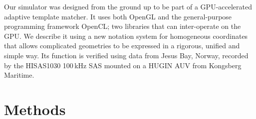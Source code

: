 
Our simulator was designed from the ground up to be part of a GPU-accelerated adaptive template matcher. It uses both OpenGL and the general-purpose programming framework OpenCL; two libraries that can inter-operate on the GPU. We describe it using a new notation system for homogeneous coordinates that allows complicated geometries to be expressed in a rigorous, unified and simple way. Its function is verified using data from Jesus Bay, Norway, recorded by the HISAS1030 100\,kHz SAS  mounted on a HUGIN AUV from Kongsberg Maritime.



\section{Methods}\label{IV_methods}




